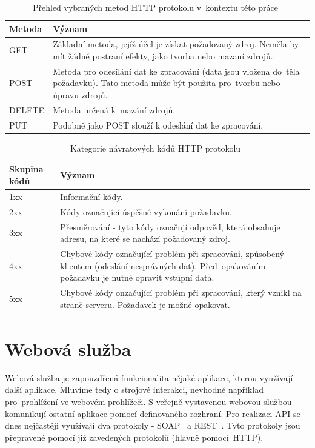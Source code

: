 \begin{table}[ht!]
  \centering
  \begin{tabular}{|l|p{10.1cm}|}
    \hline
    \textbf{Metoda} & \textbf{Význam}\\
    \hline
    GET & Základní metoda, jejíž účel je získat požadovaný zdroj. Neměla by mít žádné postraní efekty, jako tvorba nebo mazaní zdrojů.\\
    \hline
    POST & Metoda pro odesílání dat ke zpracování (data jsou vložena do~těla požadavku). Tato metoda může být použita pro~tvorbu nebo úpravu zdrojů.\\
    \hline
    DELETE & Metoda určená k~mazání zdrojů.\\
    \hline
    PUT & Podobně jako POST slouží k odeslání dat ke zpracování.\\
    \hline
  \end{tabular}
  \caption{Přehled vybraných metod HTTP protokolu v~kontextu této práce~\cite{http_metody}}
  \label{tab:http_metody}
\end{table}

\begin{table}[ht!]
  \centering
  \begin{tabular}{|l|p{9cm}|}
    \hline
    \textbf{Skupina kódů} & \textbf{Význam}\\
    \hline
    1xx & Informační kódy.\\
    \hline
    2xx & Kódy označující úspěšné vykonání požadavku.\\
    \hline
    3xx & Přesměrování - tyto kódy označují odpověď, která obsahuje adresu, na které se nachází požadovaný zdroj.\\
    \hline
    4xx & Chybové kódy označující problém při zpracování, způsobený klientem (odeslání nesprávných dat). Před~opakováním požadavku je nutné opravit vstupní data.\\
    \hline
    5xx & Chybové kódy onzačující problém při zpracování, který vznikl na straně serveru. Požadavek je možné opakovat.\\
    \hline
  \end{tabular}
  \caption{Kategorie návratových kódů HTTP protokolu~\cite{rest_vse}}
  \label{tab:http_kody}
\end{table}


\section{Webová služba}

Webová služba je zapouzdřená funkcionalita nějaké aplikace, kterou využívají další aplikace.
Mluvíme tedy o strojové interakci, nevhodné například pro~prohlížení ve webovém prohlížeči.
S veřejně vystavenou webovou službou komunikují ostatní aplikace pomocí definovaného rozhraní.
Pro realizaci API se dnes nejčastěji využívají dva protokoly - SOAP~\cite{soap} a REST~\cite{rest}.
Tyto protokoly jsou přepravené pomocí již zavedených protokolů (hlavně pomocí~HTTP).
